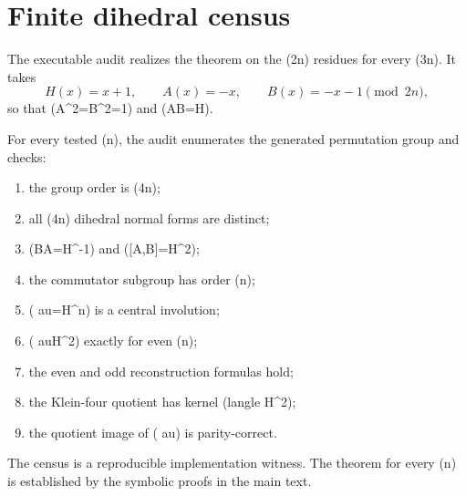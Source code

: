 \section{Finite dihedral census}

The executable audit realizes the theorem on the (2n) residues for every
(3\leq n). It takes
\[
H(x)=x+1,
\qquad
A(x)=-x,
\qquad
B(x)=-x-1
\pmod{2n},
\]
so that (A^2=B^2=1) and (AB=H).

For every tested (n), the audit enumerates the generated permutation group
and checks:
\begin{enumerate}
\item the group order is (4n);
\item all (4n) dihedral normal forms are distinct;
\item (BA=H^{-1}) and ([A,B]=H^2);
\item the commutator subgroup has order (n);
\item (	au=H^n) is a central involution;
\item (	au\in\langle H^2\rangle) exactly for even (n);
\item the even and odd reconstruction formulas hold;
\item the Klein-four quotient has kernel (langle H^2\rangle);
\item the quotient image of (	au) is parity-correct.
\end{enumerate}

The census is a reproducible implementation witness. The theorem for every
(n) is established by the symbolic proofs in the main text.

